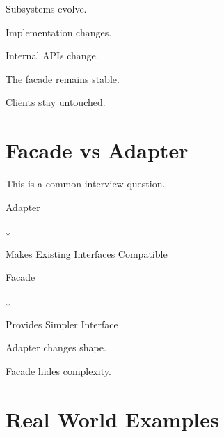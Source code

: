 \documentclass[11pt,a4paper]{book}
\begin{document}
Subsystems evolve.


Implementation changes.


Internal APIs change.


The facade remains stable.


Clients stay untouched.


\section{Facade vs Adapter}

This is a common interview
question.


\begin{mentalmodel}

Adapter

↓

Makes Existing Interfaces
Compatible

\vspace{0.5em}

Facade

↓

Provides Simpler Interface

\end{mentalmodel}


Adapter changes shape.


Facade hides complexity.


\section{Real World Examples}
\end{document}
